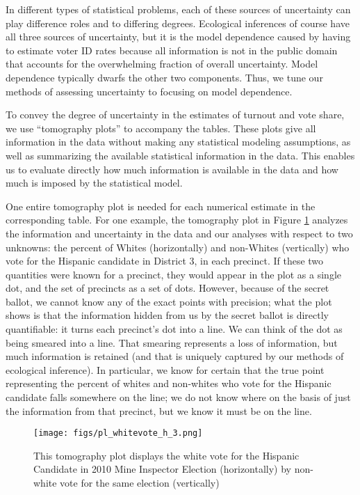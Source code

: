 \documentclass[12pt]{article}
\begin{document}
In different types of statistical problems, each of these sources of
uncertainty can play difference roles and to differing degrees.
Ecological inferences of course have all three sources of uncertainty,
but it is the model dependence caused by having to estimate voter ID
rates because all information is not in the public domain that
accounts for the overwhelming fraction of overall uncertainty.  Model
dependence typically dwarfs the other two components. Thus, we tune
our methods of assessing uncertainty to focusing on model dependence.

To convey the degree of uncertainty in the estimates of turnout and
vote share, we use ``tomography plots'' to accompany the tables.
These plots give all information in the data without making any
statistical modeling assumptions, as well as summarizing the available
statistical information in the data. This enables us to evaluate
directly how much information is available in the data and how much
is imposed by the statistical model.

One entire tomography plot is needed for each numerical estimate in
the corresponding table. For one example, the tomography plot in
Figure \ref{tomog} analyzes the information and uncertainty in the
data and our analyses with respect to two unknowns: the percent of
Whites (horizontally) and non-Whites (vertically) who vote for the
Hispanic candidate in District 3, in each precinct.  If these two
quantities were known for a precinct, they would appear in the plot as
a single dot, and the set of precincts as a set of dots.  However,
because of the secret ballot, we cannot know any of the exact points
with precision; what the plot shows is that the information hidden
from us by the secret ballot is directly quantifiable: it turns each
precinct's dot into a line.  We can think of the dot as being smeared
into a line. That smearing represents a loss of information, but much
information is retained (and that is uniquely captured by our methods
of ecological inference).  In particular, we know for certain that the
true point representing the percent of whites and non-whites who vote
for the Hispanic candidate falls somewhere on the line; we do not know
where on the basis of just the information from that precinct, but we
know it must be on the line.

\begin{figure}[htb]
\begin{centering}
\texttt{[image: figs/pl\_whitevote\_h\_3.png]}
\caption{\label{tomog}This tomography plot displays the white vote
  for the Hispanic Candidate in 2010 Mine Inspector Election
  (horizontally) by non-white vote for the same election (vertically)}
\end{centering}
\end{figure}
\end{document}
